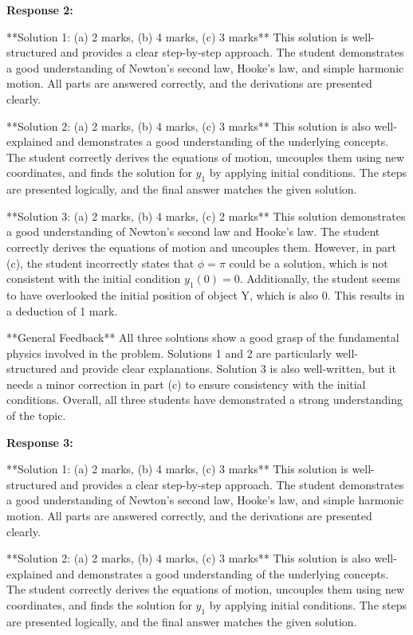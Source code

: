 \documentclass[a4paper,11pt]{article}
\begin{document}
\bigskip    
\textbf{Response 2:}

**Solution 1: (a) 2 marks, (b) 4 marks, (c) 3 marks**
This solution is well-structured and provides a clear step-by-step approach. The student demonstrates a good understanding of Newton's second law, Hooke's law, and simple harmonic motion. All parts are answered correctly, and the derivations are presented clearly. 

**Solution 2: (a) 2 marks, (b) 4 marks, (c) 3 marks**
This solution is also well-explained and demonstrates a good understanding of the underlying concepts. The student correctly derives the equations of motion, uncouples them using new coordinates, and finds the solution for \(y_1\) by applying initial conditions. The steps are presented logically, and the final answer matches the given solution.

**Solution 3: (a) 2 marks, (b) 4 marks, (c) 2 marks**
This solution demonstrates a good understanding of Newton's second law and Hooke's law. The student correctly derives the equations of motion and uncouples them. However, in part (c), the student incorrectly states that \( \phi = \pi \) could be a solution, which is not consistent with the initial condition \(y_1(0) = 0\). Additionally, the student seems to have overlooked the initial position of object Y, which is also 0. This results in a deduction of 1 mark.

**General Feedback**
All three solutions show a good grasp of the fundamental physics involved in the problem. Solutions 1 and 2 are particularly well-structured and provide clear explanations. Solution 3 is also well-written, but it needs a minor correction in part (c) to ensure consistency with the initial conditions. Overall, all three students have demonstrated a strong understanding of the topic.

\bigskip    
\textbf{Response 3:}

**Solution 1: (a) 2 marks, (b) 4 marks, (c) 3 marks**
This solution is well-structured and provides a clear step-by-step approach. The student demonstrates a good understanding of Newton's second law, Hooke's law, and simple harmonic motion. All parts are answered correctly, and the derivations are presented clearly. 

**Solution 2: (a) 2 marks, (b) 4 marks, (c) 3 marks**
This solution is also well-explained and demonstrates a good understanding of the underlying concepts. The student correctly derives the equations of motion, uncouples them using new coordinates, and finds the solution for \(y_1\) by applying initial conditions. The steps are presented logically, and the final answer matches the given solution.
\end{document}
